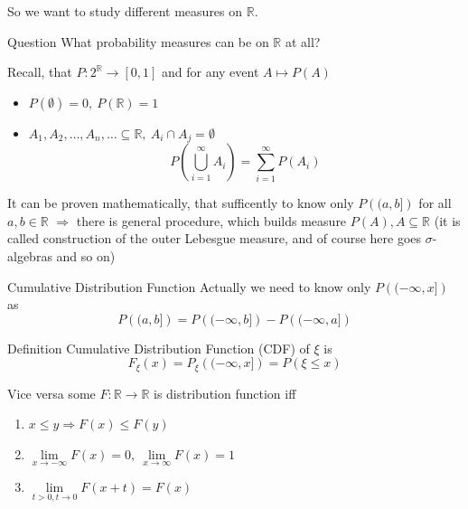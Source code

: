 \documentclass[fullscreen=true, bookmarks=true, hyperref={pdfencoding=unicode}]{beamer}
\begin{document}
\begin{frame}
  So we want to study different measures on $\mathbb{R}$.

  \pause
  \begin{block}{Question}
    What probability measures can be on $\mathbb{R}$ at all?
  \end{block}  

  \pause Recall, that $P: 2^\mathbb{R} \to [0, 1]$ and 
  for any event $A \mapsto P(A)$
  \begin{itemize}
    \pause\item $P(\emptyset) = 0,\ P(\mathbb{R}) = 1$
    \pause\item $A_1, A_2, \ldots, A_n, \ldots \subseteq \mathbb{R},\  
    A_i \cap A_j = \emptyset$
    $$ P(\bigcup\limits_{i=1}^{\infty} A_i) = \sum\limits_{i=1}^{\infty} P(A_i) $$
  \end{itemize}

  \pause
  {\small It can be proven mathematically, that sufficently to know 
  only $P\left((a, b]\right)$ for all $a, b \in \mathbb{R}$
  $\Rightarrow$ there is general procedure, 
  which builds measure $P(A), A \subseteq \mathbb{R}$ 
  (it is called construction of the outer Lebesgue measure, 
  and of course here goes $\sigma$-algebras and so on)}
\end{frame}


\begin{frame}{Cumulative Distribution Function}
  Actually we need to know only $P\left((-\infty, x]\right)$ as 
  $$ P\left((a, b]\right) = P\left((-\infty, b]\right) - P\left((-\infty, a]\right) $$

  \pause
  \begin{block}{Definition}
    Cumulative Distribution Function (CDF) of 
    $\xi$ is $$F_\xi(x) = P_\xi\left((-\infty, x]\right) = P(\xi \leq x)$$
  \end{block}  

  \pause
  Vice versa some $F: \mathbb{R} \to \mathbb{R}$ is distribution function iff
  \begin{enumerate}
    \pause\item $x \leq y \Rightarrow F(x) \leq F(y)$
    \pause\item $\lim\limits_{x\to -\infty} F(x) = 0,\ \lim\limits_{x\to \infty} F(x) = 1$
    \pause\item $\lim\limits_{t > 0, t \to 0} F(x+t) = F(x)$
  \end{enumerate}

\end{frame}
\end{document}
